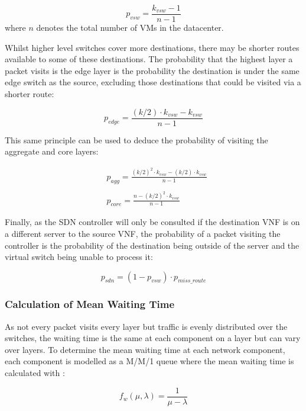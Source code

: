 \begin{equation}
\label{eq:p_vm}
p_{vsw} = \frac{k_{vsw} - 1}{n - 1}
\end{equation}
\noindent where $n$ denotes the total number of VMs in the datacenter.

Whilst higher level switches cover more destinations, there may be shorter routes available to some of these destinations. The probability that the highest layer a packet visits is the edge layer is the probability the destination is under the same edge switch as the source, excluding those destinations that could be visited via a shorter route:

\begin{equation}
\label{eq:p_edge}
p_{edge} = \frac{(k/2) \cdot k_{vsw} - k_{vsw}}{n - 1}
\end{equation}

This same principle can be used to deduce the probability of visiting the aggregate and core layers:

\begin{align}
\label{eq:p_agg_core}
&p_{agg} = \frac{(k/2)^2 \cdot k_{vsw} - (k/2) \cdot k_{vsw}}{n - 1} \\ \nonumber \\
&p_{core} = \frac{n - (k/2)^2 \cdot k_{vsw}}{n - 1}
\end{align}

Finally, as the SDN controller will only be consulted if the destination VNF is on a different server to the source VNF, the probability of a packet visiting the controller is the probability of the destination being outside of the server and the virtual switch being unable to process it:

\begin{equation}
\label{eq:p_sdn}
p_{sdn} = (1 - p_{vsw}) \cdot p_{miss\_route}
\end{equation}

\subsubsection{Calculation of Mean Waiting Time}
As not every packet visits every layer but traffic is evenly distributed over the switches, the waiting time is the same at each component on a layer but can vary over layers. To determine the mean waiting time at each network component, each component is modelled as a M/M/1 queue where the mean waiting time is calculated with \cite{Kleinrock75}:

\begin{equation}
\label{eq:MM1_time_in_network}
f_w(\mu, \lambda) = \frac{1}{\mu - \lambda}
\end{equation}

